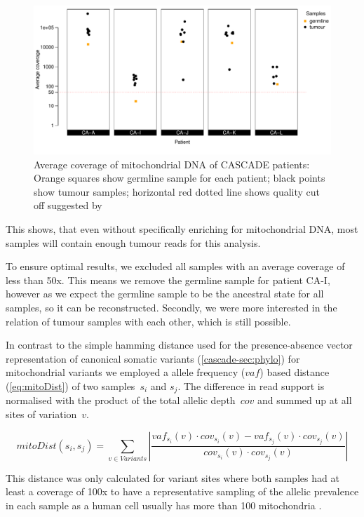 \begin{figure}[!ht]
\centering
\includegraphics[width=.99\linewidth]{Figures/CASCADE/mtCoverage}
\vspace{-1em}
\caption[Average coverage of mitochondrial DNA of CASCADE patients]{Average coverage of mitochondrial DNA of CASCADE patients: Orange squares show germline sample for each patient; black points show tumour samples; horizontal red dotted line shows quality cut off suggested by \protect\textcite{Ludwig2019}} \label{fig:cas86schematic}
\end{figure}

This shows, that even without specifically enriching for mitochondrial DNA, most samples will contain enough tumour reads for this analysis.

To ensure optimal results, we excluded all samples with an average coverage of less than 50x. This means we remove the germline sample for patient CA-I, however as we expect the germline sample to be the ancestral state for all samples, so it can be reconstructed. Secondly, we were more interested in the relation of tumour samples with each other, which is still possible.

In contrast to the simple hamming distance used for the presence-absence vector representation of canonical somatic variants (\autoref{cascade-sec:phylo}) for mitochondrial variants we employed a allele frequency ($vaf$) based distance (\autoref{eq:mitoDist}) of two samples~$s_i$ and $s_j$. The difference in read support is normalised with the product of the total allelic depth~$cov$ and summed up at all sites of variation~$v$.

\begin{equation}
mitoDist(s_i,s_j) = \sum_{v \in Variants} \left| \frac{vaf_{s_i}(v) \cdot cov_{s_i}(v) - vaf_{s_j}(v) \cdot cov_{s_j}(v)}{cov_{s_i}(v) \cdot cov_{s_j}(v)} \right| \label{eq:mitoDist}
\end{equation}
\myequation[\ref{eq:mitoDist}]{Mitochondrial variants based distance function of two samples}

This distance was only calculated for variant sites where both samples had at least a coverage of 100x to have a representative sampling of the allelic prevalence in each sample as a human cell usually has more than 100 mitochondria \cite{Cole2016}.